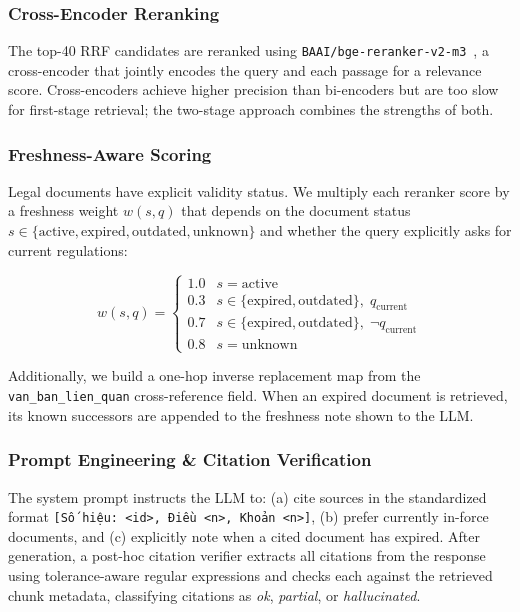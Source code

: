 \documentclass[conference]{IEEEtran}
\begin{document}
\subsubsection{Cross-Encoder Reranking}

The top-40 RRF candidates are reranked using
\texttt{BAAI/bge-reranker-v2-m3}~\cite{bge}, a cross-encoder that jointly
encodes the query and each passage for a relevance score. Cross-encoders
achieve higher precision than bi-encoders but are too slow for first-stage
retrieval; the two-stage approach combines the strengths of both.

\subsubsection{Freshness-Aware Scoring}

Legal documents have explicit validity status. We multiply each reranker
score by a freshness weight $w(s, q)$ that depends on the document status
$s \in \{\text{active}, \text{expired}, \text{outdated}, \text{unknown}\}$
and whether the query explicitly asks for current regulations:

\begin{equation}
  w(s, q) = \begin{cases}
    1.0 & s = \text{active} \\
    0.3 & s \in \{\text{expired}, \text{outdated}\},\; q_{\text{current}} \\
    0.7 & s \in \{\text{expired}, \text{outdated}\},\; \neg q_{\text{current}} \\
    0.8 & s = \text{unknown}
  \end{cases}
\end{equation}

Additionally, we build a one-hop inverse replacement map from the
\texttt{van\_ban\_lien\_quan} cross-reference field. When an expired document
is retrieved, its known successors are appended to the freshness note shown
to the LLM.

\subsubsection{Prompt Engineering \& Citation Verification}

The system prompt instructs the LLM to: (a) cite sources in the standardized
format \texttt{[Số hiệu: <id>, Điều <n>, Khoản <n>]}, (b) prefer currently
in-force documents, and (c) explicitly note when a cited document has expired.
After generation, a post-hoc citation verifier extracts all citations from the
response using tolerance-aware regular expressions and checks each against the
retrieved chunk metadata, classifying citations as \emph{ok}, \emph{partial},
or \emph{hallucinated}.
\end{document}
